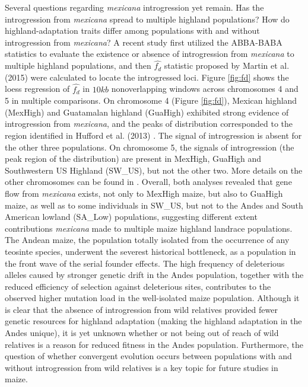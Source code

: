 \documentclass[11pt]{article}
\begin{document}
\begin{enumerate}
Several questions regarding \emph{mexicana} introgression yet remain.
Has the introgression from \emph{mexicana} spread to multiple highland populations? 
How do highland-adaptation traits differ among populations with and without introgression from \emph{mexicana}?
A recent study \cite{Wang2015manuscript} first utilized the ABBA-BABA statistics to evaluate the existence or absence of introgression from \emph{mexicana} to multiple highland populations, and then $\hat{f_{d}}$ statistic proposed by Martin et al. (2015) \citep{martin2015} were calculated to locate the introgressed loci. 
Figure \ref{fig:fd} shows the loess regression of $\hat{f_{d}}$ in $10kb$ non\-overlapping windows across chromosomes 4 and 5 in multiple comparisons. 
On chromosome 4 (Figure \ref{fig:fd}), Mexican highland (MexHigh) and Guatamalan highland (GuaHigh) exhibited strong evidence of introgression from \emph{mexicana}, and the peaks of distribution corresponded to the region identified in Hufford et al. (2013) \citep{hufford2013}.
The signal of introgression is absent for the other three populations.
On chromosome 5, the signals of introgression (the peak region of the distribution) are present in MexHigh, GuaHigh and Southwestern US Highland (SW\_US), but not the other two.
More details on the other chromosomes can be found in \cite{Wang2015manuscript}.
Overall, both analyses revealed that gene flow from \emph{mexicana} exists, not only to MexHigh maize, but also to GuaHigh maize, as well as to some individuals in SW\_US, but not to the Andes and South American lowland (SA\_Low) populations, suggesting different extent contributions \emph{mexicana} made to multiple maize highland landrace populations. 
The Andean maize, the population totally isolated from the occurrence of any teosinte species, underwent the severest historical bottleneck, as a population in the front wave of the serial founder effects. 
The high frequency of deleterious alleles caused by stronger genetic drift in the Andes population, together with the reduced efficiency of selection against deleterious sites, contributes to the observed higher mutation load in the well-isolated maize population.
Although it is clear that the absence of introgression from wild relatives provided fewer genetic resources for highland adaptation (making the highland adaptation in the Andes unique), it is yet unknown whether or not being out of reach of wild relatives is a reason for reduced fitness in the Andes population.
Furthermore, the question of whether convergent evolution occurs between populations with and without introgression from wild relatives is a key topic for future studies in maize.










\end{enumerate}
\end{document}
